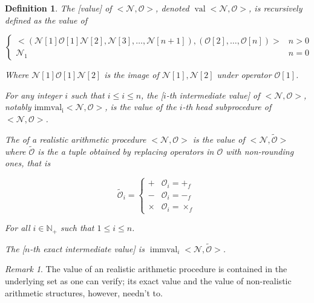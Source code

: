 \documentclass{book}
\newtheorem{definition}{Definition}
\theoremstyle{definition}\newtheorem{mechanism}{Mechanism}
\theoremstyle{remark}\newtheorem*{remark}{Remark}
\begin{document}
\begin{definition}
	The [value] of $<\mathcal N, \mathcal O>$, denoted $\operatorname{val} <\mathcal N, \mathcal O>$, is recursively defined as the value of
	
	\begin{equation*}
		\begin{cases}
			<(\mathcal{N}[1] \mathcal{O}[1] \mathcal{N}[2], \mathcal{N}[3], \dots, \mathcal{N}[n + 1]), (\mathcal{O}[2], \dots, \mathcal{O}[n])> & n > 0\\
			\mathcal {N}_1 & n = 0
		\end{cases}
	\end{equation*}
	
	Where $\mathcal{N}[1] \mathcal{O}[1] \mathcal{N}[2]$ is the image of $\mathcal{N}[1], \mathcal{N}[2]$ under operator $\mathcal{O}[1]$.
	
	For any integer $i$ such that $i \le i \le n$, the [$i$-th intermediate value] of $<\mathcal N, \mathcal O>$,  notably $\operatorname{immval_i}<\mathcal N, \mathcal O>$, is the value of the $i$-th head subprocedure of $<\mathcal N, \mathcal O>$.
	
	The  of a realistic arithmetic procedure $<\mathcal N, \mathcal O>$ is the value of $<\mathcal N, \tilde{\mathcal O}>$ where $\tilde{\mathcal O}$ is the a tuple obtained by replacing operators in $\mathcal{O}$ with non-rounding ones, that is
	
	\begin{equation*}
		\tilde{\mathcal{O}}_i = \begin{cases}
			+ & \mathcal{O}_i = +_f\\ 
			- & \mathcal{O}_i = -_f\\ 
			\times & \mathcal{O}_i = \times_f
		\end{cases}
	\end{equation*}
	
	For all $i\in \mathbb N_+$ such that $1\le i\le n$.
	
	The [$n$-th exact intermediate value] is $\operatorname{immval}_i <\mathcal N, \tilde{\mathcal O}>$.
\end{definition}

\begin{remark}
	The value of an realistic arithmetic procedure is contained in the underlying set as one can verify; its exact value and the value of non-realistic arithmetic structures, however, needn't to.
\end{remark}
\end{document}
